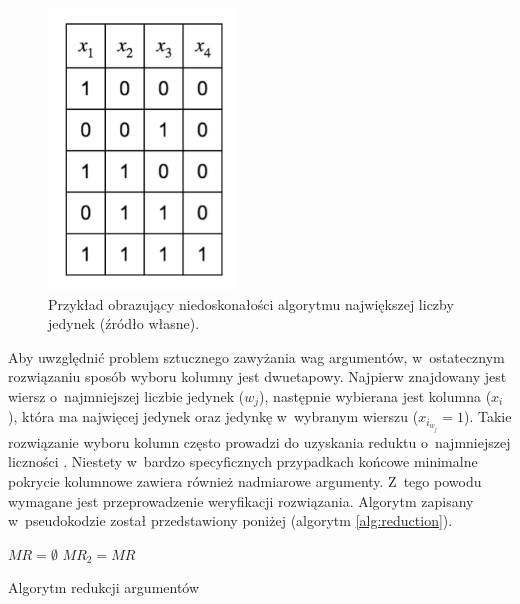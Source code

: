 \begin{figure}[H]
\centering
\includegraphics[width = 5cm]{chapter02/required-arguments.png}
\caption{Przykład obrazujący niedoskonałości algorytmu największej liczby jedynek (źródło własne).}
\label{fig:required-arguments}
\end{figure}

Aby uwzględnić problem sztucznego zawyżania wag argumentów,
w~ostatecznym rozwiązaniu sposób wyboru kolumny jest dwuetapowy.
Najpierw znajdowany jest wiersz o~najmniejszej liczbie jedynek ($w_j$),
następnie wybierana jest kolumna ($x_i$),
która ma najwięcej jedynek oraz jedynkę w~wybranym wierszu ($x_{i_{w_j}} = 1$).
Takie rozwiązanie wyboru kolumn często prowadzi do uzyskania reduktu o~najmniejszej liczności \cite{unate-artykul}.
Niestety w~bardzo specyficznych przypadkach końcowe minimalne pokrycie kolumnowe zawiera również nadmiarowe argumenty.
Z~tego powodu wymagane jest przeprowadzenie weryfikacji rozwiązania.
Algorytm zapisany w~pseudokodzie został przedstawiony poniżej (algorytm \ref{alg:reduction}).

\begin{algorithm}[h]
    $MR=\emptyset$\;
    $MR_2 = MR$\;
    \caption{Algorytm redukcji argumentów}
    \label{alg:reduction}
\end{algorithm}

